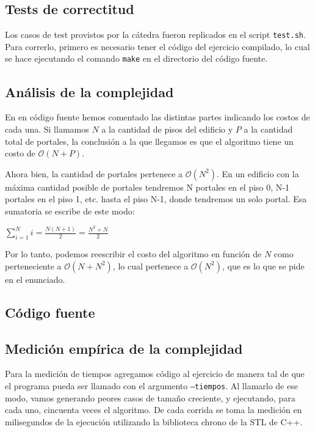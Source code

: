 \subsection{Tests de correctitud}


Los casos de test provistos por la cátedra fueron replicados en el script \texttt{test.sh}. Para correrlo, primero es necesario tener el código del ejercicio compilado, lo cual se hace ejecutando el comando \texttt{make} en el directorio del código fuente.


\subsection{Análisis de la complejidad}

En en código fuente hemos comentado las distintas partes indicando los costos de cada una. Si llamamos $N$ a la cantidad de pisos del edificio y $P$ a la cantidad total de portales, la conclusión a la que llegamos es que el algoritmo tiene un costo de $\mathcal{O}(N+P)$. 

Ahora bien, la cantidad de portales pertenece a $\mathcal{O}(N^2)$. En un edificio con la máxima cantidad posible de portales tendremos N portales en el piso 0, N-1 portales en el piso 1, etc. hasta el piso N-1, donde tendremos un solo portal. Esa sumatoria se escribe de este modo:

$\displaystyle\sum_{i=1}^{N} i = \frac{N (N+1)}{2} = \frac{N^2 + N}{2}$

Por lo tanto, podemos reescribir el costo del algoritmo en función de $N$ como perteneciente a $\mathcal{O}(N+N^2)$, lo cual pertenece a $\mathcal{O}(N^2)$, que es lo que se pide en el enunciado.

\newpage

\subsection{Código fuente}


\subsection{Medición empírica de la complejidad}

Para la medición de tiempos agregamos código al ejercicio de manera tal de que el programa pueda ser llamado con el argumento \texttt{--tiempos}. Al llamarlo de ese modo, vamos generando peores casos de tamaño creciente, y ejecutando, para cada uno, cincuenta veces el algoritmo. De cada corrida se toma la medición en milisegundos de la ejecución utilizando la biblioteca chrono de la STL de C++.

